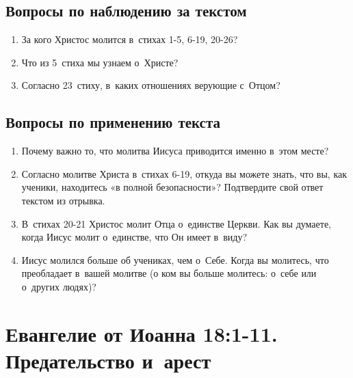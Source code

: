 \documentclass[a4paper,12pt]{article}
\begin{document}
\subsection*{Вопросы по наблюдению за текстом}
\begin{enumerate}
    \item За кого Христос молится в~стихах 1-5, 6-19, 20-26? 
    
    \myline
    
    \myline
    \item Что из 5~стиха мы узнаем о~Христе? 
    
    \myline
    
    \myline
    \item Согласно 23~стиху, в~каких отношениях верующие с~Отцом? 
    
    \myline
    
    \myline
\end{enumerate}

\subsection*{Вопросы по применению текста} 
\begin{enumerate}
    \item Почему важно то, что молитва Иисуса приводится именно в~этом месте? 
    
    \myline
    
    \myline
    \item Согласно молитве Христа в~стихах 6-19, откуда вы можете знать, что вы, как ученики, находитесь «в полной безопасности»? Подтвердите свой ответ текстом из отрывка.
    
    \myline
    
    \myline
    \item В~стихах 20-21 Христос молит Отца о~единстве Церкви. Как вы думаете, когда Иисус молит о~единстве, что Он имеет в~виду? 
    
    \myline
    
    \myline
    \item Иисус молился больше об учениках, чем о~Себе. Когда вы молитесь, что преобладает в~вашей молитве (о ком вы больше молитесь: о~себе или о~других людях)? 
    
    \myline
    
    \myline
\end{enumerate}



\section{Евангелие от Иоанна 18:1-11. Предательство и~арест}
\end{document}
